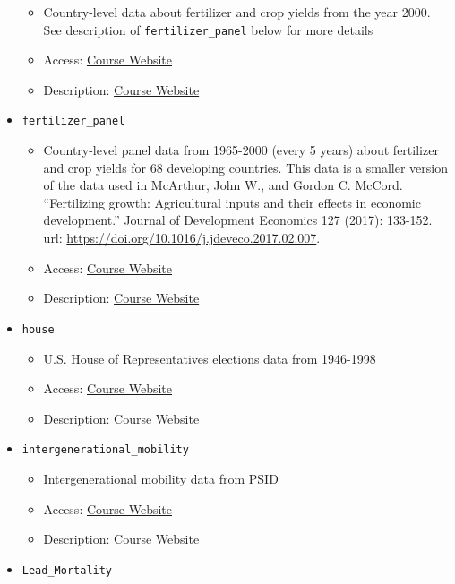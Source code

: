 \documentclass[
  letterpaper,
  DIV=11,
  numbers=noendperiod]{scrreprt}
\begin{document}
\begin{itemize}
  \begin{itemize}
  \item
    Country-level data about fertilizer and crop yields from the year
    2000. See description of \texttt{fertilizer\_panel} below for more
    details
  \item
    Access:
    \href{http://bcallaway11.github.io/Courses/ECON_4750_Fall_2023/}{Course
    Website}
  \item
    Description:
    \href{http://bcallaway11.github.io/Courses/ECON_4750_Fall_2023/}{Course
    Website}
  \end{itemize}
\item
  \texttt{fertilizer\_panel}

  \begin{itemize}
  \item
    Country-level panel data from 1965-2000 (every 5 years) about
    fertilizer and crop yields for 68 developing countries. This data is
    a smaller version of the data used in McArthur, John W., and Gordon
    C. McCord. ``Fertilizing growth: Agricultural inputs and their
    effects in economic development.'' Journal of Development Economics
    127 (2017): 133-152. url:
    \url{https://doi.org/10.1016/j.jdeveco.2017.02.007}.
  \item
    Access:
    \href{http://bcallaway11.github.io/Courses/ECON_4750_Fall_2023/}{Course
    Website}
  \item
    Description:
    \href{http://bcallaway11.github.io/Courses/ECON_4750_Fall_2023/}{Course
    Website}
  \end{itemize}
\item
  \texttt{house}

  \begin{itemize}
  \item
    U.S. House of Representatives elections data from 1946-1998
  \item
    Access:
    \href{http://bcallaway11.github.io/Courses/ECON_4750_Fall_2023/}{Course
    Website}
  \item
    Description:
    \href{http://bcallaway11.github.io/Courses/ECON_4750_Fall_2023/}{Course
    Website}
  \end{itemize}
\item
  \texttt{intergenerational\_mobility}

  \begin{itemize}
  \item
    Intergenerational mobility data from PSID
  \item
    Access:
    \href{http://bcallaway11.github.io/Courses/ECON_4750_Fall_2023/}{Course
    Website}
  \item
    Description:
    \href{http://bcallaway11.github.io/Courses/ECON_4750_Fall_2023/}{Course
    Website}
  \end{itemize}
\item
  \texttt{Lead\_Mortality}


\end{itemize}
\end{document}
